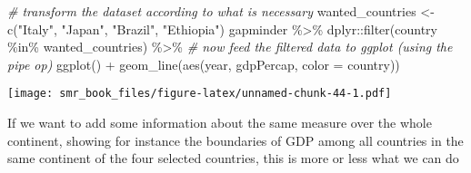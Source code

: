 \documentclass[
  oneside]{book}
\newenvironment{Shaded}{\begin{snugshade}}{\end{snugshade}}
\newcommand{\AttributeTok}[1]{\textcolor[rgb]{0.77,0.63,0.00}{#1}}
\newcommand{\CommentTok}[1]{\textcolor[rgb]{0.56,0.35,0.01}{\textit{#1}}}
\newcommand{\FunctionTok}[1]{\textcolor[rgb]{0.00,0.00,0.00}{#1}}
\newcommand{\NormalTok}[1]{#1}
\newcommand{\OtherTok}[1]{\textcolor[rgb]{0.56,0.35,0.01}{#1}}
\newcommand{\SpecialCharTok}[1]{\textcolor[rgb]{0.00,0.00,0.00}{#1}}
\newcommand{\StringTok}[1]{\textcolor[rgb]{0.31,0.60,0.02}{#1}}
\begin{document}
\begin{Shaded}
\begin{Highlighting}[]
\CommentTok{\# transform the dataset according to what is necessary}
\NormalTok{wanted\_countries }\OtherTok{\textless{}{-}} \FunctionTok{c}\NormalTok{(}\StringTok{"Italy"}\NormalTok{, }\StringTok{"Japan"}\NormalTok{, }\StringTok{"Brazil"}\NormalTok{, }\StringTok{"Ethiopia"}\NormalTok{)}
\NormalTok{gapminder }\SpecialCharTok{\%\textgreater{}\%}
\NormalTok{  dplyr}\SpecialCharTok{::}\FunctionTok{filter}\NormalTok{(country }\SpecialCharTok{\%in\%}\NormalTok{ wanted\_countries) }\SpecialCharTok{\%\textgreater{}\%}
  \CommentTok{\# now feed the filtered data to ggplot (using the pipe op)}
  \FunctionTok{ggplot}\NormalTok{() }\SpecialCharTok{+}
    \FunctionTok{geom\_line}\NormalTok{(}\FunctionTok{aes}\NormalTok{(year, gdpPercap, }\AttributeTok{color =}\NormalTok{ country))}
\end{Highlighting}
\end{Shaded}

\texttt{[image: smr\_book\_files/figure-latex/unnamed-chunk-44-1.pdf]}

If we want to add some information about the same measure over the whole
continent, showing for instance the boundaries of GDP among all countries
in the same continent of the four selected countries, this
is more or less what we can do
\end{document}
